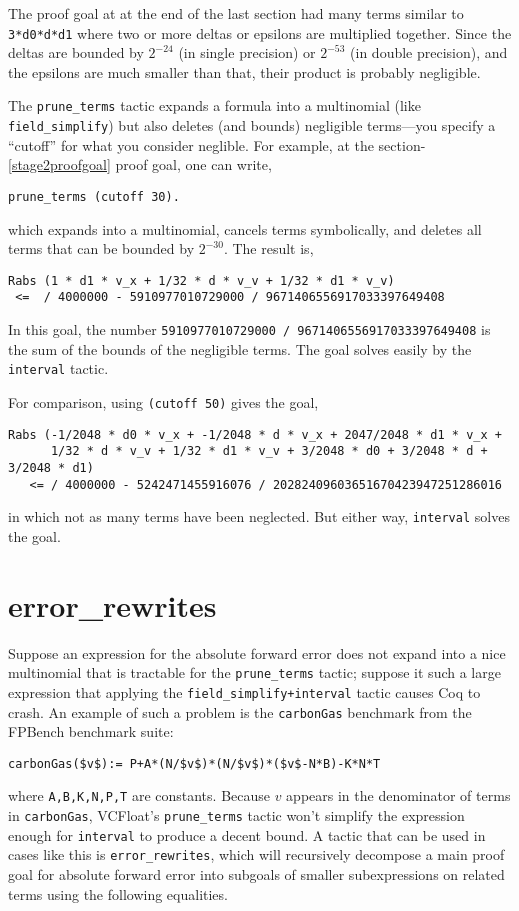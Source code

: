 \documentclass[article]{memoir}
\begin{document}
The proof goal at at the end of the last section had many terms
similar to \lstinline{3*d0*d*d1} where two or more deltas or epsilons
are multiplied together.  Since the deltas are bounded by $2^{-24}$
(in single precision) or $2^{-53}$ (in double precision),
and the epsilons are much smaller than that, their product is
probably negligible.

The \lstinline{prune_terms} tactic expands a formula into a
multinomial (like \lstinline{field_simplify}) but also
deletes (and bounds) negligible terms---you specify
a ``cutoff'' for what you consider neglible.  For example,
at the section-\ref{stage2proofgoal} proof goal,
one can write,

\begin{lstlisting}
prune_terms (cutoff 30).
\end{lstlisting}
which expands into a multinomial, cancels terms symbolically,
and deletes all terms that can be bounded by $2^{-30}$.
The result is,

\begin{lstlisting}
Rabs (1 * d1 * v_x + 1/32 * d * v_v + 1/32 * d1 * v_v)
 <=  / 4000000 - 5910977010729000 / 9671406556917033397649408
\end{lstlisting}
In this goal, the number \lstinline{5910977010729000 / 9671406556917033397649408} is the sum of the bounds of the negligible terms.
The goal solves easily by the \lstinline{interval} tactic.

For comparison, using \lstinline{(cutoff 50)} gives the goal,
\begin{lstlisting}
Rabs (-1/2048 * d0 * v_x + -1/2048 * d * v_x + 2047/2048 * d1 * v_x +
      1/32 * d * v_v + 1/32 * d1 * v_v + 3/2048 * d0 + 3/2048 * d + 3/2048 * d1)
   <= / 4000000 - 5242471455916076 / 20282409603651670423947251286016
\end{lstlisting}
in which not as many terms have been neglected.  But either way,
\lstinline{interval} solves the goal.
\chapter{error\_rewrites} Suppose an expression for the absolute
forward error does not expand into a nice multinomial
that is tractable for the \lstinline{prune_terms} tactic;
suppose it such a large expression
that applying the \lstinline{field_simplify+interval} 
tactic causes Coq to crash. An example
of such a problem is the \lstinline{carbonGas} benchmark from the
FPBench benchmark suite:
\begin{lstlisting} 
carbonGas($v$):= P+A*(N/$v$)*(N/$v$)*($v$-N*B)-K*N*T
\end{lstlisting}
where \lstinline{A,B,K,N,P,T} are constants. Because $v$ 
appears in the denominator of terms in \lstinline{carbonGas},
VCFloat's \lstinline{prune_terms} tactic won't simplify the 
expression enough for \lstinline{interval} to produce a decent 
bound. A tactic that can be used in cases like this is 
\lstinline{error_rewrites}, which will recursively
decompose a main proof goal for absolute forward error into 
subgoals of smaller subexpressions on related terms using the 
following equalities.  
 
\end{document}
